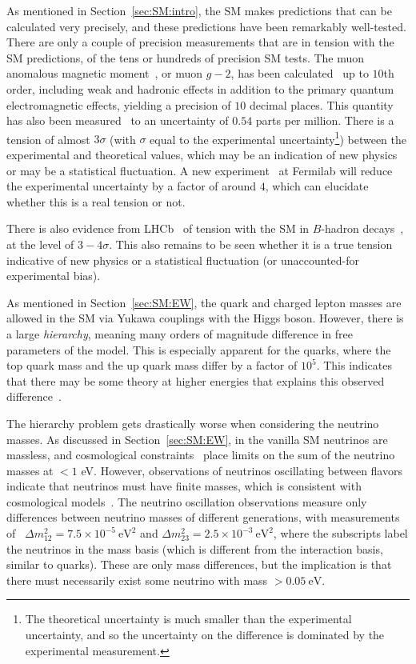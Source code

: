 As mentioned in Section~\ref{sec:SM:intro}, the SM makes predictions that can be calculated very precisely, and these predictions have been remarkably well-tested.
There are only a couple of precision measurements that are in tension with the SM predictions, of the tens or hundreds of precision SM tests.
The muon anomalous magnetic moment~\cite{Blum:2013xva}, or muon $g-2$, has been calculated~\cite{Aoyama:2012wk} up to $10$th order, including weak and hadronic effects in addition to the primary quantum electromagnetic effects, yielding a precision of $10$ decimal places.
This quantity has also been measured~\cite{Bennett:2006fi} to an uncertainty of $0.54$ parts per million.
There is a tension of almost $3\sigma$ (with $\sigma$ equal to the experimental uncertainty\footnote{The theoretical uncertainty is much smaller than the experimental uncertainty, and so the uncertainty on the difference is dominated by the experimental measurement.}) between the experimental and theoretical values, which may be an indication of new physics or may be a statistical fluctuation.
A new experiment~\cite{Chapelain:2017syu} at Fermilab will reduce the experimental uncertainty by a factor of around $4$, which can elucidate whether this is a real tension or not.

There is also evidence from LHCb~\cite{Alves:2008zz} of tension with the SM in $B$-hadron decays~\cite{Capdevila:2017bsm}, at the level of $3-4\sigma$.
This also remains to be seen whether it is a true tension indicative of new physics or a statistical fluctuation (or unaccounted-for experimental bias).

As mentioned in Section~\ref{sec:SM:EW}, the quark and charged lepton masses are allowed in the SM via Yukawa couplings with the Higgs boson.
However, there is a large \textit{hierarchy}, meaning many orders of magnitude difference in free parameters of the model.
This is especially apparent for the quarks, where the top quark mass and the up quark mass differ by a factor of $10^5$. 
This indicates that there may be some theory at higher energies that explains this observed difference~\cite{Xing:2014sja}.

The hierarchy problem gets drastically worse when considering the neutrino masses.
As discussed in Section~\ref{sec:SM:EW}, in the vanilla SM neutrinos are massless, and cosmological constraints~\cite{Ade:2013zuv} place limits on the sum of the neutrino masses at $<1$ eV.
However, observations of neutrinos oscillating between flavors~\cite{Fukuda:1998mi} indicate that neutrinos must have finite masses, which is consistent with cosmological models~\cite{Battye:2013xqa}.
The neutrino oscillation observations measure only differences between neutrino masses of different generations, with measurements of~\cite{Araki:2004mb,Evans:2013pka,PDG} $\Delta m_{12}^2=7.5\times10^{-5}~\text{eV}^2$ and $\Delta m_{23}^2=2.5\times10^{-3}~\text{eV}^2$, where the subscripts label the neutrinos in the mass basis (which is different from the interaction basis, similar to quarks).
These are only mass differences, but the implication is that there must necessarily exist some neutrino with mass $>0.05~\text{eV}$.

